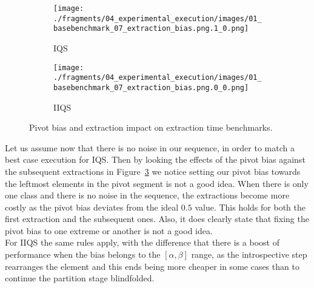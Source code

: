 \begin{figure}
    \centering
    \begin{subfigure}[b]{0.45\textwidth}
        \centering
        \texttt{[image: ./fragments/04\_experimental\_execution/images/01\_basebenchmark\_07\_extraction\_bias.png.1\_0.png]}
        \caption{IQS}
        \label{FIG:BENCHMARK_07_NOISE_BIAS__0_0}
    \end{subfigure}
    \hfill
    \begin{subfigure}[b]{0.45\textwidth}
        \centering
        \texttt{[image: ./fragments/04\_experimental\_execution/images/01\_basebenchmark\_07\_extraction\_bias.png.0\_0.png]}
        \caption{IIQS}
        \label{FIG:BENCHMARK_07_NOISE_BIAS__0_1}
    \end{subfigure}

    \caption{Pivot bias and extraction impact on extraction time benchmarks.}
    \label{FIG:BENCHMARK_07_NOISE_BIAS}
\end{figure}


Let us assume now that there is no noise in our sequence, in order to match a best case execution for IQS. Then by looking the effects of the pivot bias against the subsequent extractions in Figure~\ref{FIG:BENCHMARK_07_NOISE_BIAS} we notice setting our pivot bias towards the leftmost elements in the pivot segment is not a good idea. When there is only one class and there is no noise in the sequence, the extractions become more costly as the pivot bias deviates from the ideal $0.5$ value. This holds for both the first extraction and the subsequent ones. Also, it does clearly state that fixing the pivot bias to one extreme or another is not a good idea. \\

For IIQS the same rules apply, with the difference that there is a boost of performance when the bias belongs to the $[\alpha,\beta]$ range, as the introspective step rearranges the element and this ends being more cheaper in some cases than to continue the partition stage blindfolded.\\

\FloatBarrier